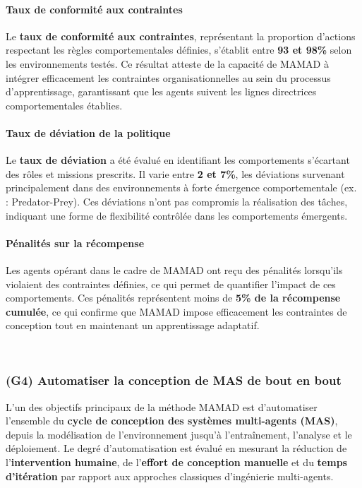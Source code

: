 \paragraph{Taux de conformité aux contraintes}
Le \textbf{taux de conformité aux contraintes}, représentant la proportion d'actions respectant les règles comportementales définies, s'établit entre \textbf{93 et 98\%} selon les environnements testés. Ce résultat atteste de la capacité de MAMAD à intégrer efficacement les contraintes organisationnelles au sein du processus d'apprentissage, garantissant que les agents suivent les lignes directrices comportementales établies.

\paragraph{Taux de déviation de la politique}
Le \textbf{taux de déviation} a été évalué en identifiant les comportements s'écartant des rôles et missions prescrits. Il varie entre \textbf{2 et 7\%}, les déviations survenant principalement dans des environnements à forte émergence comportementale (ex. : Predator-Prey). Ces déviations n'ont pas compromis la réalisation des tâches, indiquant une forme de flexibilité contrôlée dans les comportements émergents.

\paragraph{Pénalités sur la récompense}
Les agents opérant dans le cadre de MAMAD ont reçu des pénalités lorsqu'ils violaient des contraintes définies, ce qui permet de quantifier l'impact de ces comportements. Ces pénalités représentent moins de \textbf{5\% de la récompense cumulée}, ce qui confirme que MAMAD impose efficacement les contraintes de conception tout en maintenant un apprentissage adaptatif.

\

\subsubsection{(G4) Automatiser la conception de MAS de bout en bout}

L'un des objectifs principaux de la méthode MAMAD est d'automatiser l'ensemble du \textbf{cycle de conception des systèmes multi-agents (MAS)}, depuis la modélisation de l'environnement jusqu'à l'entraînement, l'analyse et le déploiement. Le degré d'automatisation est évalué en mesurant la réduction de l'\textbf{intervention humaine}, de l'\textbf{effort de conception manuelle} et du \textbf{temps d'itération} par rapport aux approches classiques d'ingénierie multi-agents.

